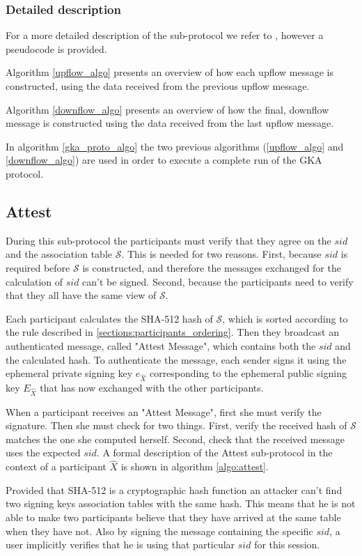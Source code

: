 \subsubsection{Detailed description}
For a more detailed description of the sub-protocol we refer to \cite{mpenc}, however a pseudocode is provided.

Algorithm \ref{upflow_algo} presents an overview of how each upflow message is constructed, using the data received from the previous upflow message.

Algorithm \ref{downflow_algo} presents an overview of how the final, downflow message is constructed using the data received from the last upflow message.

In algorithm \ref{gka_proto_algo} the two previous algorithms (\ref{upflow_algo} and \ref{downflow_algo}) are used in order to execute a complete run of the GKA protocol.

\subsection{Attest}
\label{subsections:attest}
During this sub-protocol the participants must verify that they agree on the $sid$ and the association table $\mathcal{S}$. This is needed for two reasons. First, because $sid$ is required before $\mathcal{S}$ is constructed, and therefore the messages exchanged for the calculation of $sid$ can't be signed. Second, because the participants need to verify that they all have the same view of $\mathcal{S}$.

Each participant calculates the SHA-512 hash of $\mathcal{S}$, which is sorted according to the rule described in \ref{sections:participants_ordering}. Then they broadcast an authenticated message, called "Attest Message", which contains both the $sid$ and the calculated hash. To authenticate the message, each sender signs it using the ephemeral private signing key $e_{\hat{X}}$ corresponding to the ephemeral public signing key $E_{\hat{X}}$ that has now exchanged with the other participants.

When a participant receives an "Attest Message", first she must verify the signature. Then she must check for two things. First, verify the received hash of $\mathcal{S}$ matches the one she computed herself. Second, check that the received message uses the expected $sid$. A formal description of the Attest sub-protocol in the context of a participant $\hat{X}$ is shown in algorithm \ref{algo:attest}.

Provided that SHA-512 is a cryptographic hash function an attacker can't find two signing keys association tables with the same hash. This means that he is not able to make two participants believe that they have arrived at the same table when they have not. Also by signing the message containing the specific $sid$, a user implicitly verifies that he is using that particular $sid$ for this session.

